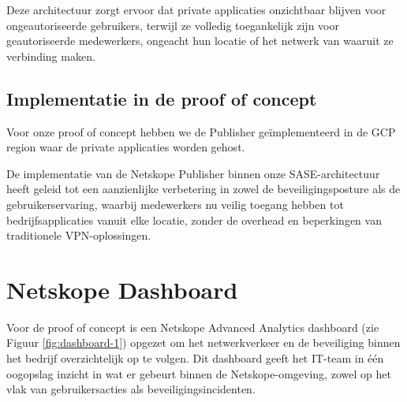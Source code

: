 Deze architectuur zorgt ervoor dat private applicaties onzichtbaar blijven voor ongeautoriseerde gebruikers, terwijl ze volledig toegankelijk zijn voor geautoriseerde medewerkers, ongeacht hun locatie of het netwerk van waaruit ze verbinding maken.

\subsection{Implementatie in de proof of concept}

Voor onze proof of concept hebben we de Publisher geïmplementeerd in de GCP region waar de private applicaties worden gehost.



De implementatie van de Netskope Publisher binnen onze SASE-architectuur heeft geleid tot een aanzienlijke verbetering in zowel de beveiligingsposture als de gebruikerservaring, waarbij medewerkers nu veilig toegang hebben tot bedrijfsapplicaties vanuit elke locatie, zonder de overhead en beperkingen van traditionele VPN-oplossingen.

\section{Netskope Dashboard}
Voor de proof of concept is een Netskope Advanced Analytics dashboard (zie Figuur \ref{fig:dashboard-1}) opgezet om het netwerkverkeer en de beveiliging binnen het bedrijf overzichtelijk op te volgen. Dit dashboard geeft het IT-team in één oogopslag inzicht in wat er gebeurt binnen de Netskope-omgeving, zowel op het vlak van gebruikersacties als beveiligingsincidenten.

